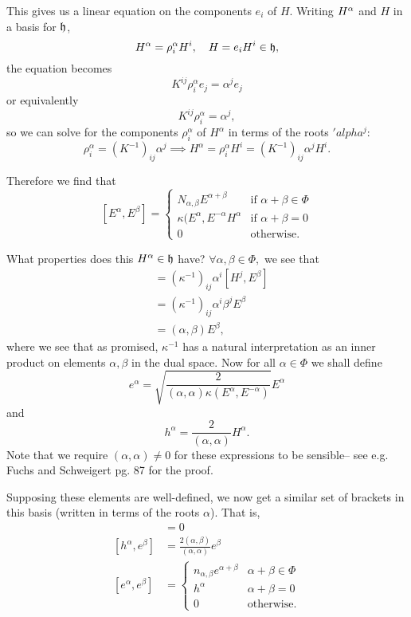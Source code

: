 This gives us a linear equation on the components $e_i$ of $H$. Writing $H^\alpha$ and $H$ in a basis for $\mathfrak{h}$,
$$H^\alpha=\rho_i^\alpha H^i, \quad H=e_i H^i \in \mathfrak{h},$$
the equation becomes
$$K^{ij} \rho^{\alpha}_i e_j= \alpha^j e_j$$
or equivalently
$$K^{ij} \rho_i^\alpha= \alpha^j,$$
so we can solve for the components $\rho_i^\alpha$ of $H^\alpha$ in terms of the roots $'alpha^j$:
$$\rho_i^\alpha = (K^{-1})_{ij} \alpha^j \implies H^\alpha = \rho_i^\alpha H^i = (K^{-1})_{ij} \alpha^j H^i.$$

Therefore we find that
$$[E^\alpha,E^\beta]=\begin{cases}
N_{\alpha,\beta}E^{\alpha+\beta} & \text{if }\alpha+\beta\in \Phi\\
\kappa(E^\alpha, E^{-\alpha}H^\alpha & \text {if }\alpha+\beta=0\\
0 & \text{otherwise.}
\end{cases}
$$

What properties does this $H^\alpha \in \mathfrak{h}$ have? $\forall \alpha,\beta \in \Phi,$ we see that
\begin{align*}
    [H^\alpha,E^\beta]&=(\kappa^{-1})_{ij}\alpha^i [H^j,E^\beta]\\
    &=(\kappa^{-1})_{ij}\alpha^i \beta^j E^\beta\\
    &=(\alpha,\beta) E^\beta,
\end{align*}
where we see that as promised, $\kappa^{-1}$ has a natural interpretation as an inner product on elements $\alpha,\beta$ in the dual space. Now for all $\alpha\in \Phi$ we shall define
$$e^\alpha=\sqrt{\frac{2}{(\alpha,\alpha)\kappa(E^\alpha, E^{-\alpha})}}E^\alpha$$
and
$$h^\alpha=\frac{2}{(\alpha,\alpha)}H^{\alpha}.$$
Note that we require $(\alpha,\alpha)\neq 0$ for these expressions to be sensible-- see e.g. Fuchs and Schweigert pg. 87 for the proof.

Supposing these elements are well-defined, we now get a similar set of brackets in this basis (written in terms of the roots $\alpha$). That is,
\begin{align*}
    [h^\alpha, h^\beta]&= 0\\
    [h^\alpha,e^\beta]&= \frac{2(\alpha,\beta)}{(\alpha,\alpha)}e^\beta\\
    [e^\alpha,e^\beta]&=\begin{cases}
    n_{\alpha,\beta} e^{\alpha+\beta} & \alpha+\beta \in \Phi\\
    h^\alpha & \alpha+\beta =0\\
    0 & \text{otherwise}.
    \end{cases}
\end{align*}

